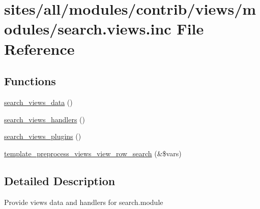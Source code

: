 \hypertarget{search_8views_8inc}{
\section{sites/all/modules/contrib/views/modules/search.views.inc File Reference}
\label{search_8views_8inc}
}
\subsection*{Functions}
\begin{CompactItemize}
\item 
\hyperlink{group__views__search__module_gd91fdcb8037644087387a30d3a5719ee}{search\_\-views\_\-data} ()
\item 
\hyperlink{group__views__search__module_gee2b59b8bd9fcc8bd9ff152f48f6b4b8}{search\_\-views\_\-handlers} ()
\item 
\hyperlink{group__views__search__module_gef27a11e726ee0039e3ffeed38562df3}{search\_\-views\_\-plugins} ()
\item 
\hyperlink{group__views__search__module_gd2005db0a4841d084cadac887649bf6f}{template\_\-preprocess\_\-views\_\-view\_\-row\_\-search} (\&\$vars)
\end{CompactItemize}


\subsection{Detailed Description}
Provide views data and handlers for search.module 